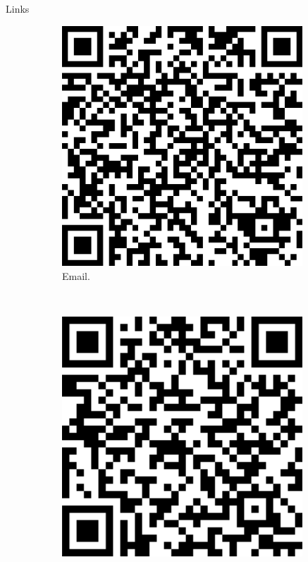 \documentclass[20pt]{beamer}
\begin{document}
\begin{frame}[fragile,t]
\begin{columns}[t]
\begin{column}{0.33\linewidth}
    \begin{block}{Links}
\vspace{0.5cm}
\begin{figure}
    \begin{subfigure}[b]{0.2\textwidth}
\includegraphics[width=0.99\textwidth]{images/qrcode_email_alber_ipia_at_inpe.png} \\
\centering
{Email.}
    \end{subfigure}
    ~
    \begin{subfigure}[b]{0.2\textwidth}
\includegraphics[width=0.99\textwidth]{images/qrcode_prioritizedeforestationhotspots.png} \\

\end{subfigure}
\end{figure}
\end{block}
\end{column}
\end{columns}
\end{frame}
\end{document}
